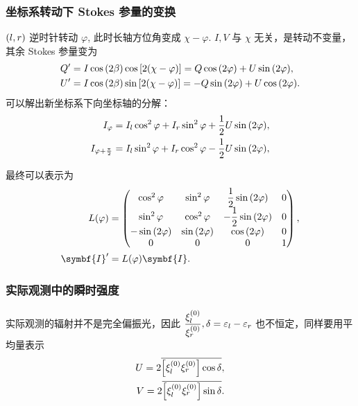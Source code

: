 \documentclass[../天体物理基础.tex]{subfiles}
\begin{document}
\subsubsection{坐标系转动下 Stokes 参量的变换}
$\mleft(l, r\mright)$ 逆时针转动 $\varphi$, 此时长轴方位角变成 $\chi-\varphi$. $I, V$ 与 $\chi$ 无关，是转动不变量，其余 Stokes 参量变为
\begin{align}
Q'&=I\cos{\mleft(2\beta\mright)}\cos{\mleft[2\mleft(\chi-\varphi\mright)\mright]}=Q\cos{\mleft(2\varphi\mright)}+U\sin{\mleft(2\varphi\mright)},\\
U'&=I\cos{\mleft(2\beta\mright)}\sin{\mleft[2\mleft(\chi-\varphi\mright)\mright]}=-Q\sin{\mleft(2\varphi\mright)}+U\cos{\mleft(2\varphi\mright)}.
\end{align}
可以解出新坐标系下向坐标轴的分解：
\begin{align}
I_{\varphi}&=I_{l}\cos^{2}{\varphi}+I_{r}\sin^{2}{\varphi}+\frac{1}{2}U\sin{\mleft(2\varphi\mright)},\\
I_{\varphi+\frac{\pi}{2}}&=I_{l}\sin^{2}{\varphi}+I_{r}\cos^{2}{\varphi}-\frac{1}{2}U\sin{\mleft(2\varphi\mright)},
\end{align}

最终可以表示为
\begin{align}
L\mleft(\varphi\mright)&=\begin{pmatrix}
\cos^{2}{\varphi} &\sin^{2}{\varphi} &\dfrac{1}{2}\sin{\mleft(2\varphi\mright)} & 0\\
\sin^{2}{\varphi} &\cos^{2}{\varphi} & -\dfrac{1}{2}\sin{\mleft(2\varphi\mright)} & 0\\
-\sin{\mleft(2\varphi\mright)} &\sin{\mleft(2\varphi\mright)} &\cos{\mleft(2\varphi\mright)} & 0\\
0 & 0 & 0 & 1
\end{pmatrix},\\
\symbf{I}'&=L\mleft(\varphi\mright)\symbf{I}.
\end{align}

\subsubsection{实际观测中的瞬时强度}
实际观测的辐射并不是完全偏振光，因此 $\dfrac{\xi_{l}^{\mleft(0\mright)}}{\xi_{r}^{\mleft(0\mright)}},\delta=\varepsilon_{l}-\varepsilon_{r}$ 也不恒定，同样要用平均量表示
\begin{align}
U=2\overline{\mleft[\xi_{l}^{\mleft(0\mright)}\xi_{r}^{\mleft(0\mright)}\mright]\cos{\delta}},\\
V=2\overline{\mleft[\xi_{l}^{\mleft(0\mright)}\xi_{r}^{\mleft(0\mright)}\mright]\sin{\delta}}.
\end{align}
\end{document}
